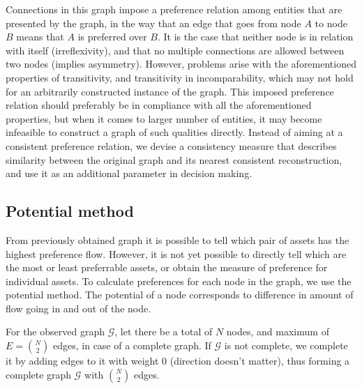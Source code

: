 \documentclass[letterpaper, 10pt, conference]{ieeeconf}
\newcommand{\graph}[1]{\mathcal{#1}}
\begin{document}
  Connections in this graph impose a preference relation among entities that are presented by the graph, in the way that an edge that goes from node $A$ to node $B$ means that $A$ is preferred over $B$.
  It is the case that neither node is in relation with itself (irreflexivity), and that no multiple connections are allowed between two nodes (implies asymmetry).
  However, problems arise with the aforementioned properties of transitivity, and transitivity in incomparability, which may not hold for an arbitrarily constructed instance of the graph.
  This imposed preference relation should preferably be in compliance with all the aforementioned properties, but when it comes to larger number of entities, it may become infeasible to construct a graph of such qualities directly.
  Instead of aiming at a consistent preference relation, we devise a consistency measure that describes similarity between the original graph and its nearest consistent reconstruction, and use it as an additional parameter in decision making.
  
%  

  
   
  \subsection{Potential method}
  \label{sub:potential}
  From previously obtained graph it is possible to tell which pair of assets has the highest preference flow.
  However, it is not yet possible to directly tell which are the most or least preferrable assets, or obtain the measure of preference for individual assets.
  To calculate preferences for each node in the graph, we use the potential method\cite{caklovic}.
  The potential of a node corresponds to difference in amount of flow going in and out of the node.
  
    For the observed graph $\graph{G}$, let there be a total of $N$ nodes, and maximum of $E = \binom{N}{2}$ edges, in case of a complete graph.
    If $\graph{G}$ is not complete, we complete it by adding edges to it with weight 0 (direction doesn't matter),
    thus forming a complete graph $\graph{G}$ with $\binom{N}{2}$ edges.
    
\end{document}
